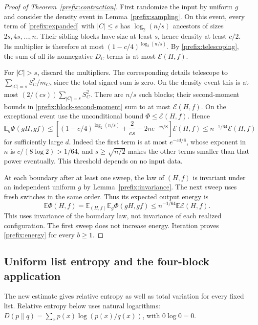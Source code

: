 \begin{proof}[Proof of Theorem~\ref{prefix:contraction}]
First randomize the input by uniform $g$ and consider the density event
in Lemma~\ref{prefix:sampling}. On this event,
every term of \eqref{prefix:expanded} with $|C|\le s$ has
$\log_2(n/s)$ ancestors of sizes $2s,4s,\ldots,n$. Their sibling
blocks have size at least $s$, hence density at least $c/2$.  Its multiplier is therefore at most
$(1-c/4)^{\log_2(n/s)}$.  By \eqref{prefix:telescoping}, the sum of
all its nonnegative $D_C$ terms is at most $\mathcal E(H,f)$.

For $|C|>s$, discard the multipliers.  The corresponding details
telescope to $\sum_{|C|=s}S_C^2/m_C$, since the total signed sum is
zero.  On the density event this is at most
$(2/(cs))\sum_{|C|=s}S_C^2$.  There are $n/s$ such blocks; their
second-moment bounds in \eqref{prefix:block-second-moment} sum to
at most $\mathcal E(H,f)$.  On the exceptional event use the
unconditional bound $\Phi\le\mathcal E(H,f)$.  Hence
\begin{equation}\label{prefix:randomized-bound}
 \mathbb E_g\Phi(gH,gf)
 \le\left[(1-c/4)^{\log_2(n/s)}+\frac{2}{cs}
                   +2n e^{-cs/8}\right]\mathcal E(H,f)
 \le n^{-1/64}\mathcal E(H,f)
\end{equation}
for sufficiently large $d$.  Indeed the first term is at most
$e^{-cd/8}$, whose exponent in $n$ is $c/(8\log2)>1/64$,
and $s\ge\sqrt{n/2}$ makes the other terms smaller than that power
eventually.  This threshold depends on no input data.

At each boundary after at least one sweep, the law of $(H,f)$ is
invariant under an independent uniform $g$ by
Lemma~\ref{prefix:invariance}.  The next sweep uses fresh switches
in the same order.  Thus its expected output energy is
\[
 \mathbb E\Phi(H,f)=\mathbb E_{(H,f)}\mathbb E_g\Phi(gH,gf)
                 \le n^{-1/64}\mathbb E\mathcal E(H,f).
\]
This uses invariance of the boundary law, not invariance of each
realized configuration.  The first sweep does not increase energy.
Iteration proves \eqref{prefix:energy} for every $b\ge1$.
\end{proof}

\subsection{Uniform list entropy and the four-block application}
The new estimate gives relative entropy as well as total variation
for every fixed list.  Relative entropy below uses natural logarithms:
$D(p\|q)=\sum_xp(x)\log(p(x)/q(x))$, with $0\log0=0$.

